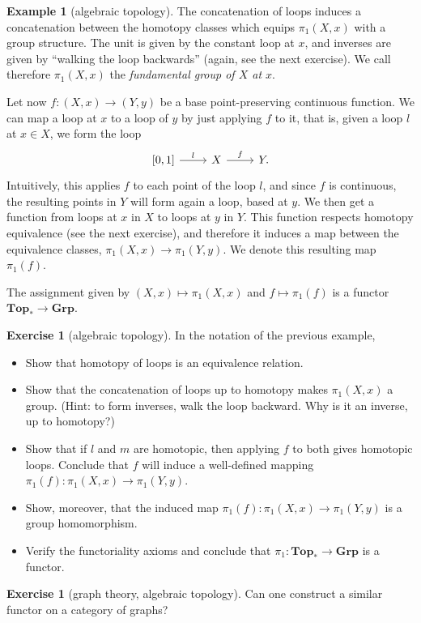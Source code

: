 \documentclass[12pt,oneside]{scrbook}
\numberwithin{equation}{section}
\theoremstyle{plain}
\theoremstyle{definition}
\newtheorem{eg}[thm]{Example}
\newtheorem{ex}[thm]{Exercise}
\newcommand{\cat}[1]{{\mathbf{#1}}} %
\newcommand{\ar}[2][]{\arrow{#2}{#1}}
\newcommand{\Grp}{\cat{Grp}}
\DeclareMathOperator{\1}{\mathbbm{1}}
\DeclareMathOperator{\2}{\mathbbm{2}}
\let\originalleft\left
\let\originalright\right
\renewcommand{\left}{\mathopen{}\mathclose\bgroup\originalleft}
\renewcommand{\right}{\aftergroup\egroup\originalright}
\begin{document}
\begin{eg}[algebraic topology]
 The concatenation of loops induces a concatenation between the homotopy classes which equips $\pi_1(X,x)$ with a group structure. The unit is given by the constant loop at $x$, and inverses are given by ``walking the loop backwards'' (again, see the next exercise). We call therefore $\pi_1(X,x)$ the \emph{fundamental group of $X$ at $x$}. 
 
 Let now $f:(X,x)\to(Y,y)$ be a base point-preserving continuous function. We can map a loop at $x$ to a loop of $y$ by just applying $f$ to it, that is, given a loop $l$ at $x\in X$, we form the loop
 $$
 \begin{tikzcd}
  \left[0,1\right] \ar{r}{l} & X \ar{r}{f} & Y . 
 \end{tikzcd}
 $$
 Intuitively, this applies $f$ to each point of the loop $l$, and since $f$ is continuous, the resulting points in $Y$ will form again a loop, based at $y$. We then get a function from loops at $x$ in $X$ to loops at $y$ in $Y$. This function respects homotopy equivalence (see the next exercise), and therefore it induces a map between the equivalence classes, $\pi_1(X,x) \to \pi_1(Y,y)$. We denote this resulting map $\pi_1(f)$.
 
 The assignment given by $(X,x)\mapsto \pi_1(X,x)$ and $f\mapsto \pi_1(f)$ is a functor $\cat{Top_*}\to\Grp$.
\end{eg}

\begin{ex}[algebraic topology]
In the notation of the previous example,
\begin{itemize}
 \item Show that homotopy of loops is an equivalence relation.
 \item Show that the concatenation of loops up to homotopy makes $\pi_1(X,x)$ a group. (Hint: to form inverses, walk the loop backward. Why is it an inverse, up to homotopy?)
 \item Show that if $l$ and $m$ are homotopic, then applying $f$ to both gives homotopic loops. Conclude that $f$ will induce a well-defined mapping $\pi_1(f): \pi_1(X,x) \to \pi_1(Y,y)$.
 \item Show, moreover, that the induced map $\pi_1(f): \pi_1(X,x) \to \pi_1(Y,y)$ is a group homomorphism. 
 \item Verify the functoriality axioms and conclude that $\pi_1:\cat{Top_*}\to\Grp$ is a functor.
\end{itemize}
\end{ex}

\begin{ex}[graph theory, algebraic topology]
 Can one construct a similar functor on a category of graphs?
\end{ex}
\end{document}
